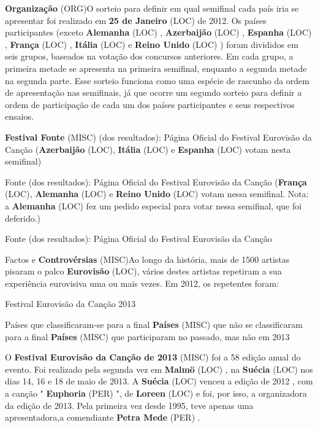 \documentclass[12pt,a4paper]{article}
\begin{document}
\textbf{Organização} (ORG)O sorteio para definir em qual semifinal cada país iria se apresentar foi realizado em \textbf{25 de Janeiro} (LOC) de 2012. Os países participantes (exceto \textbf{Alemanha} (LOC) , \textbf{Azerbaijão} (LOC) , \textbf{Espanha} (LOC) , \textbf{França} (LOC) , \textbf{Itália} (LOC) e \textbf{Reino Unido} (LOC) ) foram divididos em seis grupos, baseados na votação dos concursos anteriores. Em cada grupo, a primeira metade se apresenta na primeira semifinal, enquanto a segunda metade na segunda parte. Esse sorteio funciona como uma espécie de rascunho da ordem de apresentação nas semifinais, já que ocorre um segundo sorteio para definir a ordem de participação de cada um dos países participantes e seus respectivos ensaios.



\textbf{Festival Fonte} (MISC) (dos resultados): Página Oficial do Festival Eurovisão da Canção (\textbf{Azerbaijão} (LOC), \textbf{Itália} (LOC) e \textbf{Espanha} (LOC) votam nesta semifinal)

Fonte (dos resultados): Página Oficial do Festival Eurovisão da Canção (\textbf{França} (LOC), \textbf{Alemanha} (LOC) e \textbf{Reino Unido} (LOC) votam nessa semifinal. Nota: a \textbf{Alemanha} (LOC) fez um pedido especial para votar nessa semifinal, que foi deferido.)

Fonte (dos resultados): Página Oficial do Festival Eurovisão da Canção



Factos e \textbf{Controvérsias} (MISC)Ao longo da história, mais de 1500 artistas pisaram o palco \textbf{Eurovisão} (LOC), vários destes artistas repetiram a sua experiência eurovisiva uma ou mais vezes. Em 2012, os repetentes foram:



Festival Eurovisão da Canção 2013



Países que classificaram-se para a final \textbf{Países} (MISC) que não se classificaram para a final \textbf{Países} (MISC) que participaram no passado, mas não em 2013

O \textbf{Festival Eurovisão da Canção de 2013} (MISC) foi a 58 edição anual do evento. Foi realizado pela segunda vez em \textbf{Malmö} (LOC) , na \textbf{Suécia} (LOC) nos dias 14, 16 e 18 de maio de 2013. A \textbf{Suécia} (LOC) venceu a edição de 2012 , com a canção " \textbf{Euphoria} (PER) ", de \textbf{Loreen} (LOC) e foi, por isso, a organizadora da edição de 2013. Pela primeira vez desde 1995, teve apenas uma apresentadora,a comendiante \textbf{Petra Mede} (PER) .
\end{document}
